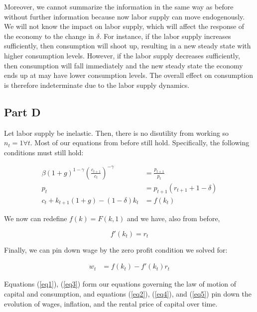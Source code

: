 \documentclass[11pt]{article} %
\begin{document}
Moreover, we cannot summarize the information in the same way as before without further information because now labor supply can move endogenously. We will not know the impact on labor supply, which will affect the response of the economy to the change in $\delta$. For instance, if the labor supply increases sufficiently, then consumption will shoot up, resulting in a new steady state with higher consumption levels. However, if the labor supply decreases sufficiently, then consumption will fall immediately and the new steady state the economy ends up at may have lower consumption levels. The overall effect on consumption is therefore indeterminate due to the labor supply dynamics.


\subsection{Part D}

Let labor supply be inelastic. Then, there is no disutility from working so $n_t = 1 \forall t.$ Most of our equations from before still hold. Specifically, the following conditions must still hold:

\begin{align}
\beta (1+g)^{1-\gamma}\left( \frac{c_{t+1}}{c_t}\right)^{-\gamma} &= \frac{p_{t+1}}{p_t} \label{eq1} \\
p_t &= p_{t+1}(r_{t+1} + 1-\delta) \label{eq2}\\ 
c_t + k_{t+1}(1+g) - (1-\delta)k_{t} &= f(k_t) \label{eq3}
\end{align}

We now can redefine $f(k) = F (k,1)$ and we have, also from before,

\begin{equation}
f'(k_t) = r_t \label{eq4}
\end{equation}

Finally, we can pin down wage by the zero profit condition we solved for:

\begin{align}
w_t &= f(k_t)  - f'(k_t)r_t \label{eq5}
\end{align}

Equations (\ref{eq1}), (\ref{eq3}) form our equations governing the law of motion of capital and consumption, and equations (\ref{eq2}), (\ref{eq4}), and (\ref{eq5}) pin down the evolution of wages, inflation, and the rental price of capital over time.
\end{document}
